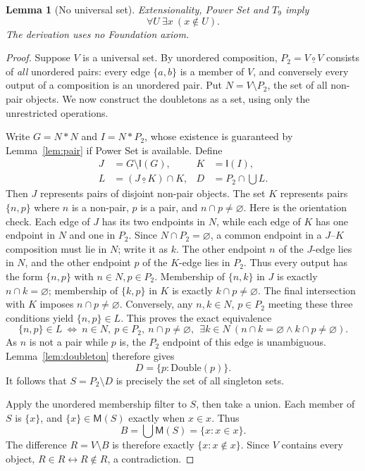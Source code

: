 \documentclass[11pt,a4paper]{article}
\numberwithin{equation}{section}
\newtheorem{lemma}[theorem]{Lemma}
\newcommand{\up}[2]{\{#1,#2\}}
\newcommand{\Comp}{\mathbin{\underline{\circ}}}
\newcommand{\UnProd}{\mathbin{\ast}}
\newcommand{\Int}{\mathsf{I}}
\newcommand{\Mem}{\mathsf{M}}
\newcommand{\Tnine}{T_9}
\begin{document}
\begin{lemma}[No universal set]\label{lem:no-univ}
Extensionality, Power Set and $\Tnine$ imply
\[
\forall U\ \exists x\ (x\notin U).
\]
The derivation uses no Foundation axiom.
\end{lemma}
\begin{proof}
Suppose $V$ is a universal set.  By unordered composition, $P_2=V\Comp V$ consists of \emph{all} unordered pairs: every edge $\up ab$ is a member of $V$, and conversely every output of a composition is an unordered pair.  Put $N=V\setminus P_2$, the set of all non-pair objects.  We now construct the doubletons as a set, using only the unrestricted operations.

Write $G=N\UnProd N$ and $I=N\UnProd P_2$, whose existence is guaranteed by Lemma~\ref{lem:pair} if Power Set is available.  Define
\begin{equation}\label{eq:frege}
\begin{aligned}
J&=G\setminus\Int(G), & K&=\Int(I),\\
L&=(J\Comp K)\cap K, & D&=P_2\cap\bigcup L.
\end{aligned}
\end{equation}
Then $J$ represents pairs of disjoint non-pair objects.  The set $K$ represents pairs $\up np$ where $n$ is a non-pair, $p$ is a pair, and $n\cap p\ne\varnothing$.  Here is the orientation check.  Each edge of $J$ has its two endpoints in $N$, while each edge of $K$ has one endpoint in $N$ and one in $P_2$.  Since $N\cap P_2=\varnothing$, a common endpoint in a $J$--$K$ composition must lie in $N$; write it as $k$.  The other endpoint $n$ of the $J$-edge lies in $N$, and the other endpoint $p$ of the $K$-edge lies in $P_2$.  Thus every output has the form $\up np$ with $n\in N,p\in P_2$.  Membership of $\up nk$ in $J$ is exactly $n\cap k=\varnothing$; membership of $\up kp$ in $K$ is exactly $k\cap p\ne\varnothing$.  The final intersection with $K$ imposes $n\cap p\ne\varnothing$.  Conversely, any $n,k\in N$, $p\in P_2$ meeting these three conditions yield $\up np\in L$.  This proves the exact equivalence
\begin{equation}\label{eq:frege-orient}
\up np\in L\ \Longleftrightarrow\
n\in N,\ p\in P_2,\ n\cap p\ne\varnothing,\
\ \exists k\in N\ (n\cap k=\varnothing\land k\cap p\ne\varnothing).
\end{equation}  As $n$ is not a pair while $p$ is, the $P_2$ endpoint of this edge is unambiguous.  Lemma~\ref{lem:doubleton} therefore gives
\[
D=\{p:\mathrm{Double}(p)\}.
\]
It follows that $S=P_2\setminus D$ is precisely the set of all singleton sets.

Apply the unordered membership filter to $S$, then take a union.  Each member of $S$ is $\{x\}$, and $\{x\}\in\Mem(S)$ exactly when $x\in x$.  Thus
\[
B=\bigcup\Mem(S)=\{x:x\in x\}.
\]
The difference $R=V\setminus B$ is therefore exactly $\{x:x\notin x\}$.  Since $V$ contains every object, $R\in R\leftrightarrow R\notin R$, a contradiction.

\end{proof}
\end{document}
